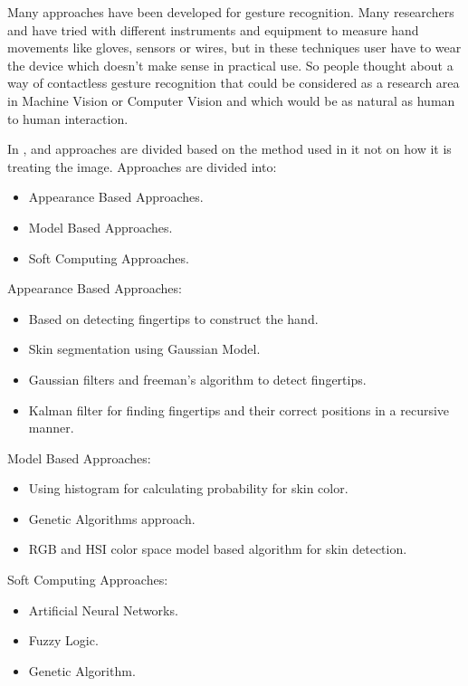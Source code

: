 Many approaches have been developed for gesture recognition. Many researchers \cite{yrel7} and \cite{yrel16} have tried with different instruments and equipment to measure hand movements like gloves, sensors or wires, but in these techniques user have to wear the device which doesn’t make sense in practical use. So people thought about a way of contactless gesture recognition that could be considered as a research area in Machine Vision or Computer Vision and which would be as natural as human to human interaction.
\bigskip

In \cite{yrel1},\cite{relatedsg1} and \cite{relatedsg2}  approaches are divided based on the method used in it not on how it is treating the image. Approaches are divided into:
\begin{itemize}
\item Appearance Based Approaches.
\item Model Based Approaches.
\item Soft Computing Approaches.
\end{itemize}

\bigskip

Appearance Based Approaches:
\begin{itemize}

\item Based on detecting fingertips to construct the hand.
\item Skin segmentation using Gaussian Model.
\item Gaussian filters and freeman's algorithm to detect fingertips.
\item Kalman filter for finding fingertips and their correct positions in a recursive manner.
\end{itemize}

\bigskip

Model Based Approaches:
\begin{itemize}
\item Using histogram for calculating probability for skin color.
\item Genetic Algorithms approach.
\item RGB and HSI color space model based algorithm for skin detection.	
\end{itemize}

\bigskip
Soft Computing Approaches:
\begin{itemize}
\item Artificial Neural Networks.
\item Fuzzy Logic.
\item Genetic Algorithm.
\end{itemize}

